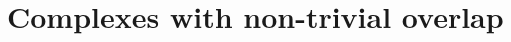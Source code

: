 \documentclass[10pt]{book}
\begin{document}












\part{Complexes with non-trivial overlap}











\end{document}
